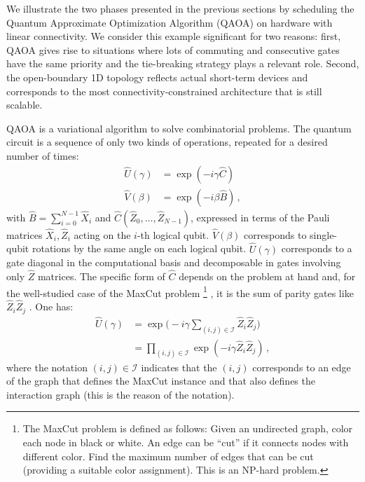 \documentclass[%
onecolumn,pra,
superscriptaddress,
nofootinbib,
 amsmath,amssymb,
 aps,
11pt,
]{revtex4-1}
\begin{document}
We illustrate the two phases presented in the previous sections by scheduling the Quantum Approximate Optimization Algorithm (QAOA) \cite{Farhi2014,Wecker2016,Guerreschi2017a} on hardware with linear connectivity. We consider this example significant for two reasons: first, QAOA gives rise to situations where lots of commuting and consecutive gates have the same priority and the tie-breaking strategy plays a relevant role. Second, the open-boundary 1D topology reflects actual short-term devices \cite{Blatt2008,Barends2016,Harris2016} and corresponds to the most connectivity-constrained architecture that is still scalable.

QAOA is a variational algorithm to solve combinatorial problems. The quantum circuit is a sequence of only two kinds of operations, repeated for a desired number of times:
\begin{align}
\label{eq:QAOA_operations}
	\hat{U}(\gamma) &= \exp{(-i \gamma \hat{C})} \nonumber \\
	\hat{V}(\beta)  &= \exp{(-i \beta  \hat{B})} \, ,
\end{align}
with $\hat{B}=\sum_{i=0}^{N-1} \hat{X}_i$ and $\hat{C}(\hat{Z}_0,\ldots,\hat{Z}_{N-1})$, expressed in terms of the Pauli matrices $\hat{X}_i, \hat{Z}_i$ acting on the $i$-th logical qubit. $\hat{V}(\beta)$ corresponds to single-qubit rotations by the same angle on each logical qubit. $\hat{U}(\gamma)$ corresponds to a gate diagonal in the computational basis and decomposable in gates involving only $\hat{Z}$ matrices. The specific form of $\hat{C}$ depends on the problem at hand and, for the well-studied case of the MaxCut problem%
\footnote{The MaxCut problem is defined as follows: Given an undirected graph, color each node in black or white. An edge can be ``cut'' if it connects nodes with different color. Find the maximum number of edges that can be cut (providing a suitable color assignment). This is an NP-hard problem.}%
, it is the sum of parity gates like $\hat{Z}_i \hat{Z}_j$ \cite{Farhi2014,Wecker2016,Guerreschi2017a,Venturelli2018,Otterbach2017a}. One has:
\begin{align}
\label{eq:QAOA_U}
	\hat{U}(\gamma) &= \exp{\Big(-i \gamma \sum_{(i,j)\in\mathcal{I}} \hat{Z}_i \hat{Z}_j\Big)} \nonumber \\
					&= \prod_{(i,j)\in\mathcal{I}} \exp{\left(-i \gamma \hat{Z}_i \hat{Z}_j\right)} \, ,
\end{align}
where the notation $(i,j)\in\mathcal{I}$ indicates that the $(i,j)$ corresponds to an edge of the graph that defines the MaxCut instance and that also defines the interaction graph (this is the reason of the notation).
\end{document}
